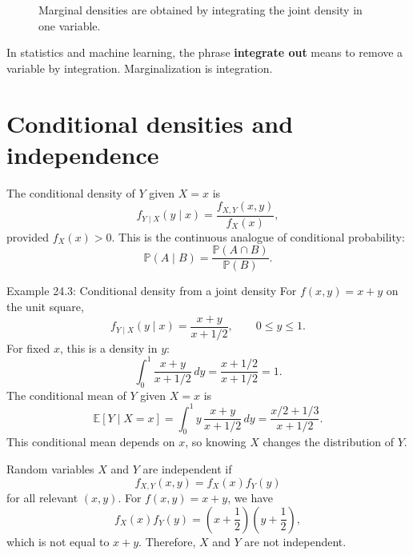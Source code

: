 \documentclass[11pt,oneside]{book}
\newcommand{\E}{\mathbb E}
\newcommand{\Prob}{\mathbb P}
\newcommand{\dd}{\,d}
\begin{document}
\begin{figure}[H]
\centering
{}
\caption{Marginal densities are obtained by integrating the joint density in one variable.}
\end{figure}

\begin{tipbox}
In statistics and machine learning, the phrase \textbf{integrate out} means to remove a variable by integration. Marginalization is integration.
\end{tipbox}

\section{Conditional densities and independence}

The conditional density of $Y$ given $X=x$ is
\[
f_{Y\mid X}(y\mid x)=\frac{f_{X,Y}(x,y)}{f_X(x)},
\]
provided $f_X(x)>0$. This is the continuous analogue of conditional probability:
\[
\Prob(A\mid B)=\frac{\Prob(A\cap B)}{\Prob(B)}.
\]

\begin{examplebox}{Example 24.3: Conditional density from a joint density}
For $f(x,y)=x+y$ on the unit square,
\[
f_{Y\mid X}(y\mid x)=\frac{x+y}{x+1/2},\qquad 0\le y\le 1.
\]
For fixed $x$, this is a density in $y$:
\[
\int_0^1\frac{x+y}{x+1/2}\dd y=\frac{x+1/2}{x+1/2}=1.
\]
The conditional mean of $Y$ given $X=x$ is
\[
\E[Y\mid X=x]=\int_0^1 y\,\frac{x+y}{x+1/2}\dd y=\frac{x/2+1/3}{x+1/2}.
\]
This conditional mean depends on $x$, so knowing $X$ changes the distribution of $Y$.
\end{examplebox}

Random variables $X$ and $Y$ are independent if
\[
f_{X,Y}(x,y)=f_X(x)f_Y(y)
\]
for all relevant $(x,y)$. For $f(x,y)=x+y$, we have
\[
f_X(x)f_Y(y)=\left(x+\frac12\right)\left(y+\frac12\right),
\]
which is not equal to $x+y$. Therefore, $X$ and $Y$ are not independent.
\end{document}

